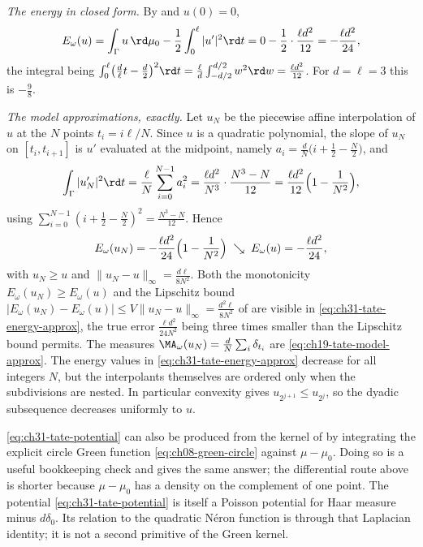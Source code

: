 \begin{example}
\emph{The energy in closed form.}  By  and
$u(0)=0$,
\begin{equation}
\label{eq:ch31-tate-energy}
 E_\omega(u)=\int_\Gamma u\,\rd\mu_0-\frac12\int_0^\ell|u'|^2\rd t
 =0-\frac12\cdot\frac{\ell d^2}{12}
 =-\frac{\ell d^2}{24},
\end{equation}
the integral being
$\int_0^\ell\bigl(\tfrac d\ell t-\tfrac d2\bigr)^2\rd t
 =\tfrac\ell d\int_{-d/2}^{d/2}w^2\rd w=\tfrac{\ell d^2}{12}$.
For $d=\ell=3$ this is $-\tfrac98$.

\emph{The model approximations, exactly.}  Let $u_N$ be the piecewise
affine interpolation of $u$ at the $N$ points $t_i=i\ell/N$.  Since
$u$ is a quadratic polynomial, the slope of $u_N$ on
$[t_i,t_{i+1}]$ is $u'$ evaluated at the midpoint, namely
$a_i=\tfrac dN\bigl(i+\tfrac12-\tfrac N2\bigr)$, and
\[
 \int_\Gamma|u_N'|^2\rd t
 =\frac\ell N\sum_{i=0}^{N-1}a_i^2
 =\frac{\ell d^2}{N^3}\cdot\frac{N^3-N}{12}
 =\frac{\ell d^2}{12}\Bigl(1-\frac1{N^2}\Bigr),
\]
using $\sum_{i=0}^{N-1}(i+\tfrac12-\tfrac N2)^2=\tfrac{N^3-N}{12}$.
Hence
\begin{equation}
\label{eq:ch31-tate-energy-approx}
 E_\omega(u_N)=-\frac{\ell d^2}{24}\Bigl(1-\frac1{N^2}\Bigr)
 \;\searrow\;E_\omega(u)=-\frac{\ell d^2}{24},
\end{equation}
with $u_N\geq u$ and $\|u_N-u\|_\infty=\tfrac{d\ell}{8N^2}$.  Both the
monotonicity $E_\omega(u_N)\geq E_\omega(u)$ and the Lipschitz bound
$|E_\omega(u_N)-E_\omega(u)|\leq V\|u_N-u\|_\infty=\tfrac{d^2\ell}{8N^2}$
of  are visible in
\eqref{eq:ch31-tate-energy-approx}, the true error $\tfrac{\ell d^2}{24N^2}$
being three times smaller than the Lipschitz bound permits.  The measures
$\MA_\omega(u_N)=\tfrac dN\sum_i\delta_{t_i}$ are
\eqref{eq:ch19-tate-model-approx}.  The energy values in
\eqref{eq:ch31-tate-energy-approx} decrease for all integers $N$, but the
interpolants themselves are ordered only when the subdivisions are nested.
In particular convexity gives $u_{2^{j+1}}\leq u_{2^j}$, so the dyadic
subsequence decreases uniformly to $u$.
\end{example}

\begin{remark}
\label{rem:ch31-circle-green}
\eqref{eq:ch31-tate-potential} can also be produced from the kernel of
 by integrating the explicit circle Green
function \eqref{eq:ch08-green-circle} against $\mu-\mu_0$.  Doing so is a
useful bookkeeping check and gives the same answer; the differential
route above is shorter because $\mu-\mu_0$ has a density on the
complement of one point.  The potential \eqref{eq:ch31-tate-potential} is itself a Poisson
potential for Haar measure minus $d\delta_0$.  Its relation to the
quadratic N\'eron function is through that Laplacian identity; it is not
a second primitive of the Green kernel.
\end{remark}

